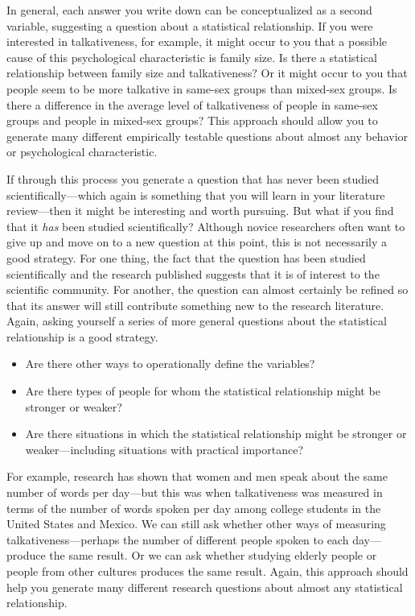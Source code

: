 \documentclass[
]{krantz}
\providecommand{\tightlist}{%
  \setlength{\itemsep}{0pt}\setlength{\parskip}{0pt}}
\begin{document}
In general, each answer you write down can be conceptualized as a second variable, suggesting a question about a statistical relationship. If you were interested in talkativeness, for example, it might occur to you that a possible cause of this psychological characteristic is family size. Is there a statistical relationship between family size and talkativeness? Or it might occur to you that people seem to be more talkative in same-sex groups than mixed-sex groups. Is there a difference in the average level of talkativeness of people in same-sex groups and people in mixed-sex groups? This approach should allow you to generate many different empirically testable questions about almost any behavior or psychological characteristic.

If through this process you generate a question that has never been studied scientifically---which again is something that you will learn in your literature review---then it might be interesting and worth pursuing. But what if you find that it \emph{has} been studied scientifically? Although novice researchers often want to give up and move on to a new question at this point, this is not necessarily a good strategy. For one thing, the fact that the question has been studied scientifically and the research published suggests that it is of interest to the scientific community. For another, the question can almost certainly be refined so that its answer will still contribute something new to the research literature. Again, asking yourself a series of more general questions about the statistical relationship is a good strategy.

\begin{itemize}
\tightlist
\item
  Are there other ways to operationally define the variables?
\item
  Are there types of people for whom the statistical relationship might be stronger or weaker?
\item
  Are there situations in which the statistical relationship might be stronger or weaker---including situations with practical importance?
\end{itemize}

For example, research has shown that women and men speak about the same number of words per day---but this was when talkativeness was measured in terms of the number of words spoken per day among college students in the United States and Mexico. We can still ask whether other ways of measuring talkativeness---perhaps the number of different people spoken to each day---produce the same result. Or we can ask whether studying elderly people or people from other cultures produces the same result. Again, this approach should help you generate many different research questions about almost any statistical relationship.
\end{document}
